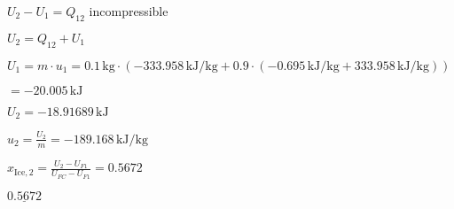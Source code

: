 \( U_2 - U_1 = Q_{12} \) incompressible  

\( U_2 = Q_{12} + U_1 \)  

\( U_1 = m \cdot u_1 = 0.1 \, \text{kg} \cdot (-333.958 \, \text{kJ/kg} + 0.9 \cdot (-0.695 \, \text{kJ/kg} + 333.958 \, \text{kJ/kg})) \)  

\( = -20.005 \, \text{kJ} \)  

\( U_2 = -18.91689 \, \text{kJ} \)  

\( u_2 = \frac{U_2}{m} = -189.168 \, \text{kJ/kg} \)  

\( x_{\text{Ice},2} = \frac{U_2 - U_{F1}}{U_{FC} - U_{F1}} = 0.5672 \)  

\( \underline{0.5672} \)